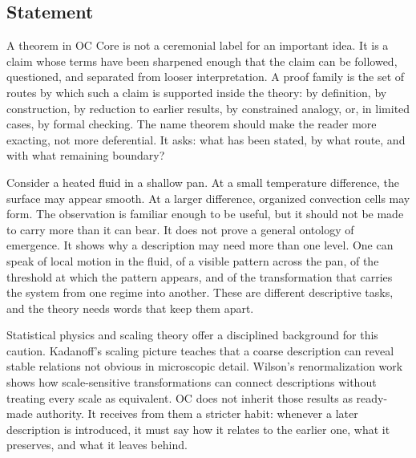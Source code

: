 \documentclass[11pt,a4paper,openany]{book}
\begin{document}
\subsection{Statement}
A theorem in OC Core is not a ceremonial label for an important idea. It is a claim whose terms have been sharpened enough that the claim can be followed, questioned, and separated from looser interpretation. A proof family is the set of routes by which such a claim is supported inside the theory: by definition, by construction, by reduction to earlier results, by constrained analogy, or, in limited cases, by formal checking. The name theorem should make the reader more exacting, not more deferential. It asks: what has been stated, by what route, and with what remaining boundary? \cite{goldenfeld_lectures,kadanoff_scaling}\par
Consider a heated fluid in a shallow pan. At a small temperature difference, the surface may appear smooth. At a larger difference, organized convection cells may form. The observation is familiar enough to be useful, but it should not be made to carry more than it can bear. It does not prove a general ontology of emergence. It shows why a description may need more than one level. One can speak of local motion in the fluid, of a visible pattern across the pan, of the threshold at which the pattern appears, and of the transformation that carries the system from one regime into another. These are different descriptive tasks, and the theory needs words that keep them apart.\par
Statistical physics and scaling theory offer a disciplined background for this caution. Kadanoff's scaling picture teaches that a coarse description can reveal stable relations not obvious in microscopic detail. Wilson's renormalization work shows how scale-sensitive transformations can connect descriptions without treating every scale as equivalent. OC does not inherit those results as ready-made authority. It receives from them a stricter habit: whenever a later description is introduced, it must say how it relates to the earlier one, what it preserves, and what it leaves behind.\par
\end{document}
